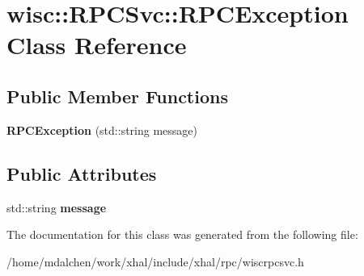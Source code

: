 \hypertarget{classwisc_1_1RPCSvc_1_1RPCException}{
\section{wisc::RPCSvc::RPCException Class Reference}
\label{classwisc_1_1RPCSvc_1_1RPCException}
}
\subsection*{Public Member Functions}
\begin{DoxyCompactItemize}
\item 
\hypertarget{classwisc_1_1RPCSvc_1_1RPCException_ad1abae3ec9536f4665272c9be2c943d7}{
{\bfseries RPCException} (std::string message)}
\label{classwisc_1_1RPCSvc_1_1RPCException_ad1abae3ec9536f4665272c9be2c943d7}

\end{DoxyCompactItemize}
\subsection*{Public Attributes}
\begin{DoxyCompactItemize}
\item 
\hypertarget{classwisc_1_1RPCSvc_1_1RPCException_aaead2195d4fafd1fe86e0b1b8231f223}{
std::string {\bfseries message}}
\label{classwisc_1_1RPCSvc_1_1RPCException_aaead2195d4fafd1fe86e0b1b8231f223}

\end{DoxyCompactItemize}


The documentation for this class was generated from the following file:\begin{DoxyCompactItemize}
\item 
/home/mdalchen/work/xhal/include/xhal/rpc/wiscrpcsvc.h\end{DoxyCompactItemize}
